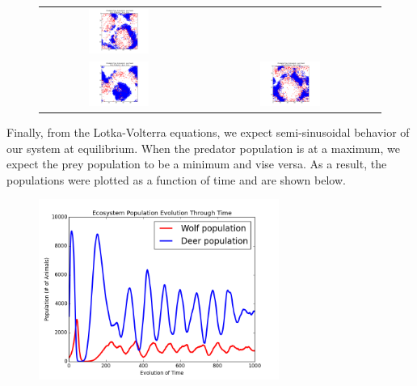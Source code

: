 \documentclass[a4paper,12pt]{article}
\begin{document}
\begin{figure}[H]
\begin{tabular}{@{}cc@{}cc@{}}
		 \includegraphics[width = 0.4\textwidth]{./pics/ecosystem_snapshot_250.png} \\
		 \includegraphics[width = 0.4\textwidth]{./pics/ecosystem_snapshot_300.png} && 
		 \includegraphics[width = 0.4\textwidth]{./pics/ecosystem_snapshot_350.png} \\
	\end{tabular}		
  \end{figure}

Finally, from the Lotka-Volterra equations, we expect semi-sinusoidal behavior of our system at equilibrium.  When the predator population is at a maximum,
we expect the prey population to be a minimum and vise versa.  As a result, the populations were plotted as a function of time and are shown below.  

\begin{figure}[H]
   \centering
      \includegraphics[width = 0.7\textwidth]{./pics/Stable_time_evo.png}
\end{figure}
\end{document}
